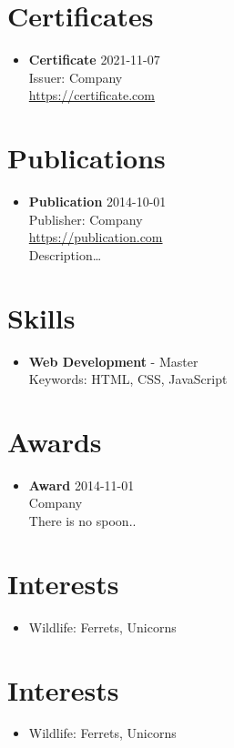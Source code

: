 \documentclass{article}
\begin{document}
\section*{Certificates}
\begin{itemize}[leftmargin=*]
		
	\item \textbf{Certificate} \hfill 2021-11-07 \\
	Issuer: Company \\
	\href{https://certificate.com}{https://certificate.com}
				
\end{itemize}
		

\section*{Publications}
\begin{itemize}[leftmargin=*]
		
	\item \textbf{Publication} \hfill 2014-10-01 \\
	Publisher: Company \\
	\href{https://publication.com}{https://publication.com} \\
	Description…
				
\end{itemize}
		

\section*{Skills}
\begin{itemize}[leftmargin=*]
		
	\item \textbf{Web Development} - Master \\
				Keywords: HTML, CSS, JavaScript
\end{itemize}
		

\section*{Awards}
\begin{itemize}[leftmargin=*]
		
	\item \textbf{Award} \hfill 2014-11-01\\
	Company \\
	There is no spoon..
				
\end{itemize}
		

\section*{Interests}
\begin{itemize}[leftmargin=*]
		\item Wildlife: Ferrets, Unicorns
\end{itemize}
		

\section*{Interests}
\begin{itemize}[leftmargin=*]
		\item Wildlife: Ferrets, Unicorns
\end{itemize}
		
\end{document}
